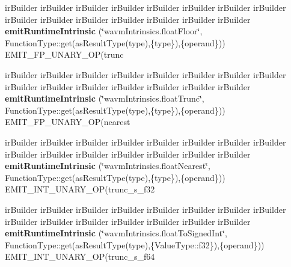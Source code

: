 \begin{DoxyCompactItemize}
ir\+Builder ir\+Builder ir\+Builder ir\+Builder ir\+Builder ir\+Builder ir\+Builder ir\+Builder ir\+Builder ir\+Builder ir\+Builder ir\+Builder ir\+Builder ir\+Builder ir\+Builder {\bfseries emit\+Runtime\+Intrinsic} (\char`\"{}wavm\+Intrinsics.\+float\+Floor\char`\"{}, Function\+Type\+::get(as\+Result\+Type(type),\{type\}),\{operand\})) E\+M\+I\+T\+\_\+\+F\+P\+\_\+\+U\+N\+A\+R\+Y\+\_\+\+OP(trunc
\item 
\mbox{\label{struct_l_l_v_m_j_i_t_1_1_emit_function_context_a365f53805d9d02840ea8961cd35130b9}} 
ir\+Builder ir\+Builder ir\+Builder ir\+Builder ir\+Builder ir\+Builder ir\+Builder ir\+Builder ir\+Builder ir\+Builder ir\+Builder ir\+Builder ir\+Builder ir\+Builder ir\+Builder {\bfseries emit\+Runtime\+Intrinsic} (\char`\"{}wavm\+Intrinsics.\+float\+Trunc\char`\"{}, Function\+Type\+::get(as\+Result\+Type(type),\{type\}),\{operand\})) E\+M\+I\+T\+\_\+\+F\+P\+\_\+\+U\+N\+A\+R\+Y\+\_\+\+OP(nearest
\item 
\mbox{\label{struct_l_l_v_m_j_i_t_1_1_emit_function_context_aefd6e0cbfc1c3322a72f65e72023531a}} 
ir\+Builder ir\+Builder ir\+Builder ir\+Builder ir\+Builder ir\+Builder ir\+Builder ir\+Builder ir\+Builder ir\+Builder ir\+Builder ir\+Builder ir\+Builder ir\+Builder ir\+Builder {\bfseries emit\+Runtime\+Intrinsic} (\char`\"{}wavm\+Intrinsics.\+float\+Nearest\char`\"{}, Function\+Type\+::get(as\+Result\+Type(type),\{type\}),\{operand\})) E\+M\+I\+T\+\_\+\+I\+N\+T\+\_\+\+U\+N\+A\+R\+Y\+\_\+\+OP(trunc\+\_\+s\+\_\+f32
\item 
\mbox{\label{struct_l_l_v_m_j_i_t_1_1_emit_function_context_a58606fc2b1d467eb25a1d2a60765df78}} 
ir\+Builder ir\+Builder ir\+Builder ir\+Builder ir\+Builder ir\+Builder ir\+Builder ir\+Builder ir\+Builder ir\+Builder ir\+Builder ir\+Builder ir\+Builder ir\+Builder ir\+Builder {\bfseries emit\+Runtime\+Intrinsic} (\char`\"{}wavm\+Intrinsics.\+float\+To\+Signed\+Int\char`\"{}, Function\+Type\+::get(as\+Result\+Type(type),\{Value\+Type\+::f32\}),\{operand\})) E\+M\+I\+T\+\_\+\+I\+N\+T\+\_\+\+U\+N\+A\+R\+Y\+\_\+\+OP(trunc\+\_\+s\+\_\+f64
\item 
\mbox{\label{struct_l_l_v_m_j_i_t_1_1_emit_function_context_a26de5230d4f3815a2bfad0153c3af349}} 

\end{DoxyCompactItemize}
